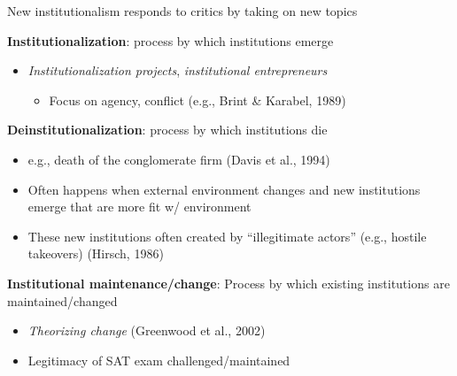 \begin{frame}{New institutionalism responds to critics by taking on new topics}

	\textbf{Institutionalization}: process by which institutions emerge
	\begin{itemize}
		\item \textit{Institutionalization projects}, \textit{institutional entrepreneurs}
		\begin{itemize}
			\item Focus on agency, conflict (e.g., Brint \& Karabel, 1989)
		\end{itemize}
	\end{itemize}		
	\vspace{2mm}
	\textbf{Deinstitutionalization}: process by which institutions die
	\begin{itemize}
		\item e.g., death of the conglomerate firm (Davis et al., 1994)
		\item Often happens when external environment changes and new institutions emerge that are more fit w/ environment
		\item These new institutions often created by ``illegitimate actors'' (e.g., hostile takeovers) (Hirsch, 1986)
	\end{itemize}
	\vspace{2mm}
	
	\textbf{Institutional maintenance/change}: Process by which existing institutions are maintained/changed
	\begin{itemize}
		\item \textit{Theorizing change} (Greenwood et al., 2002)
		\item Legitimacy of SAT exam challenged/maintained
	\end{itemize}


\end{frame}

